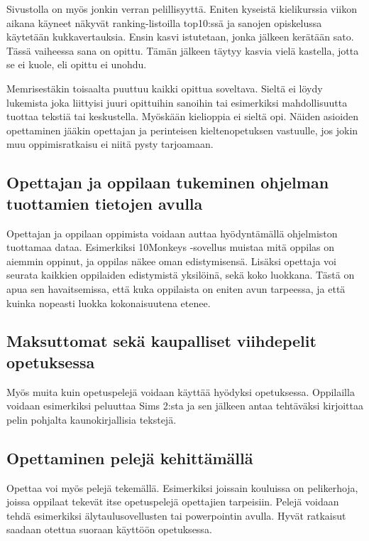 \documentclass[utf8,bachelor]{gradu3}
\begin{document}
Sivustolla on myös jonkin verran pelillisyyttä. Eniten kyseistä kielikurssia viikon aikana käyneet näkyvät ranking-listoilla top10:ssä ja sanojen opiskelussa käytetään kukkavertauksia. Ensin kasvi istutetaan, jonka jälkeen kerätään sato. Tässä vaiheessa sana on opittu. Tämän jälkeen täytyy kasvia vielä kastella, jotta se ei kuole, eli opittu ei unohdu. 

Memrisestäkin toisaalta puuttuu kaikki opittua soveltava. Sieltä ei löydy lukemista joka liittyisi juuri opittuihin sanoihin tai esimerkiksi mahdollisuutta tuottaa tekstiä tai keskustella. Myöskään kielioppia ei sieltä opi. Näiden asioiden opettaminen jääkin opettajan ja perinteisen kieltenopetuksen vastuulle, jos jokin muu oppimisratkaisu ei niitä pysty tarjoamaan.

\subsection{Opettajan ja oppilaan tukeminen ohjelman tuottamien tietojen avulla}
Opettajan ja oppilaan oppimista voidaan auttaa hyödyntämällä ohjelmiston tuottamaa dataa. Esimerkiksi 10Monkeys -sovellus muistaa mitä oppilas on aiemmin oppinut, ja oppilas näkee oman edistymisensä. Lisäksi opettaja voi seurata kaikkien oppilaiden edistymistä yksilöinä, sekä koko luokkana. Tästä on apua sen havaitsemissa, että kuka oppilaista on eniten avun tarpeessa, ja että kuinka nopeasti luokka kokonaisuutena etenee.

\subsection{Maksuttomat sekä kaupalliset viihdepelit opetuksessa}
Myös muita kuin opetuspelejä voidaan käyttää hyödyksi opetuksessa. Oppilailla voidaan esimerkiksi peluuttaa Sims 2:sta ja sen jälkeen antaa tehtäväksi kirjoittaa pelin pohjalta kaunokirjallisia tekstejä. \parencite[][41-43]{laatua}

\subsection{Opettaminen pelejä kehittämällä}
Opettaa voi myös pelejä tekemällä. Esimerkiksi joissain kouluissa on pelikerhoja, joissa oppilaat tekevät itse opetuspelejä opettajien tarpeisiin. Pelejä voidaan tehdä esimerkiksi älytaulusovellusten tai powerpointin avulla. Hyvät ratkaisut saadaan otettua suoraan käyttöön opetuksessa. \parencite[][]{peleja}
\end{document}

